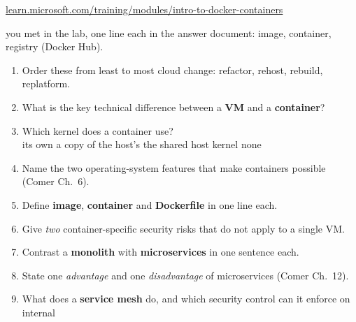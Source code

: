 \documentclass[11pt]{article}
\begin{document}
\par\noindent\mbox{\href{https://learn.microsoft.com/training/modules/intro-to-docker-containers/}{learn.microsoft.com/training/modules/intro-to-docker-containers}}

 you met in the lab, one line each in the answer document: image, container,
registry (Docker Hub).


\begin{enumerate}
\item Order these from least to most cloud change: refactor, rehost, rebuild, replatform.
\item What is the key technical difference between a \textbf{VM} and a \textbf{container}?
\item Which kernel does a container use?\\
      \cbox its own \quad \cbox a copy of the host's \quad \cbox the shared host kernel \quad \cbox none
\item Name the two operating-system features that make containers possible (Comer Ch.~6).
\item Define \textbf{image}, \textbf{container} and \textbf{Dockerfile} in one line each.
\item Give \emph{two} container-specific security risks that do not apply to a single VM.
\item Contrast a \textbf{monolith} with \textbf{microservices} in one sentence each.
\item State one \emph{advantage} and one \emph{disadvantage} of microservices (Comer Ch.~12).
\item What does a \textbf{service mesh} do, and which security control can it enforce on internal

\end{enumerate}
\end{document}
